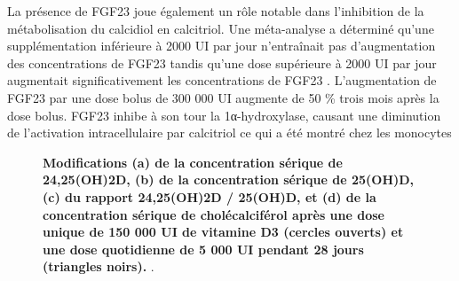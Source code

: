 \documentclass[
  a4paper,
  DIV=11,
  numbers=noendperiod,
  listof=totoc]{scrreprt}
\begin{document}
La présence de \ac{FGF23} joue également un rôle notable dans
l'inhibition de la métabolisation du calcidiol en calcitriol. Une
méta-analyse a déterminé qu'une supplémentation inférieure à 2000 UI par
jour n'entraînait pas d'augmentation des concentrations de \ac{FGF23}
tandis qu'une dose supérieure à 2000 UI par jour augmentait
significativement les concentrations de \ac{FGF23}
\autocite{Griffin.2021}. L'augmentation de \ac{FGF23} par une dose bolus
de 300 000 UI augmente de 50 \% trois mois après la dose bolus.
\ac{FGF23} inhibe à son tour la 1α-hydroxylase, causant une diminution
de l'activation intracellulaire par calcitriol ce qui a été montré chez
les monocytes \autocite{Griffin.2021}

\begin{figure}


\caption[Modifications (a) de la concentration sérique de 24,25(OH)2D,
(b) de la concentration sérique de 25(OH)D, (c) du rapport 24,25(OH)2D /
25(OH)D, et (d) de la concentration sérique de cholécalciférol après une
dose unique de 150 000 UI de vitamine D3 (cercles ouverts) et une dose
quotidienne de 5 000 UI pendant 28 jours (triangles
noirs).]{\label{fig-24-hydroxylase}\textbf{Modifications (a) de la
concentration sérique de 24,25(OH)2D, (b) de la concentration sérique de
25(OH)D, (c) du rapport 24,25(OH)2D / 25(OH)D, et (d) de la
concentration sérique de cholécalciférol après une dose unique de 150
000 UI de vitamine D3 (cercles ouverts) et une dose quotidienne de 5 000
UI pendant 28 jours (triangles noirs).} \textcite{Ketha.2018}.}

\end{figure}%
\end{document}
